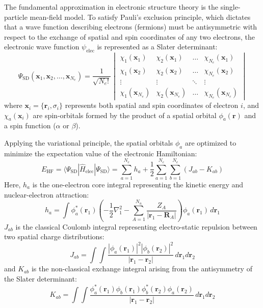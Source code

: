 \documentclass[12pt]{article}
\begin{document}
The fundamental approximation in electronic structure theory is the single-particle mean-field model. To satisfy Pauli's exclusion principle, which dictates that a wave function describing electrons (fermions) must be antisymmetric with respect to the exchange of spatial and spin coordinates of any two electrons, the electronic wave function $\psi_{\text{elec}}$ is represented as a Slater determinant:
\begin{equation}
\Psi_{\text{SD}}(\mathbf{x}_1, \mathbf{x}_2, \dots, \mathbf{x}_{N_e}) = \frac{1}{\sqrt{N_e!}} 
\begin{vmatrix}
\chi_1(\mathbf{x}_1) & \chi_2(\mathbf{x}_1) & \dots & \chi_{N_e}(\mathbf{x}_1) \\
\chi_1(\mathbf{x}_2) & \chi_2(\mathbf{x}_2) & \dots & \chi_{N_e}(\mathbf{x}_2) \\
\vdots & \vdots & \ddots & \vdots \\
\chi_1(\mathbf{x}_{N_e}) & \chi_2(\mathbf{x}_{N_e}) & \dots & \chi_{N_e}(\mathbf{x}_{N_e})
\end{vmatrix}
\end{equation}
where $\mathbf{x}_i = \{\mathbf{r}_i, \sigma_i\}$ represents both spatial and spin coordinates of electron $i$, and $\chi_a(\mathbf{x}_i)$ are spin-orbitals formed by the product of a spatial orbital $\phi_a(\mathbf{r})$ and a spin function ($\alpha$ or $\beta$).

Applying the variational principle, the spatial orbitals $\phi_a$ are optimized to minimize the expectation value of the electronic Hamiltonian:
\begin{equation}
E_{\text{HF}} = \langle \Psi_{\text{SD}} | \hat{H}_{\text{elec}} | \Psi_{\text{SD}} \rangle = \sum_{a=1}^{N_e} h_a + \frac{1}{2} \sum_{a=1}^{N_e} \sum_{b=1}^{N_e} (J_{ab} - K_{ab})
\end{equation}
Here, $h_a$ is the one-electron core integral representing the kinetic energy and nuclear-electron attraction:
\begin{equation}
h_a = \int \phi_a^*(\mathbf{r}_1) \left( -\frac{1}{2}\nabla_1^2 - \sum_{A=1}^{N_n} \frac{Z_A}{|\mathbf{r}_1 - \mathbf{R}_A|} \right) \phi_a(\mathbf{r}_1) \, d\mathbf{r}_1
\end{equation}
$J_{ab}$ is the classical Coulomb integral representing electro-static repulsion between two spatial charge distributions:
\begin{equation}
J_{ab} = \int \int \frac{|\phi_a(\mathbf{r}_1)|^2 |\phi_b(\mathbf{r}_2)|^2}{|\mathbf{r}_1 - \mathbf{r}_2|} \, d\mathbf{r}_1 d\mathbf{r}_2
\end{equation}
and $K_{ab}$ is the non-classical exchange integral arising from the antisymmetry of the Slater determinant:
\begin{equation}
K_{ab} = \int \int \frac{\phi_a^*(\mathbf{r}_1) \phi_b(\mathbf{r}_1) \phi_b^*(\mathbf{r}_2) \phi_a(\mathbf{r}_2)}{|\mathbf{r}_1 - \mathbf{r}_2|} \, d\mathbf{r}_1 d\mathbf{r}_2
\end{equation}
\end{document}
